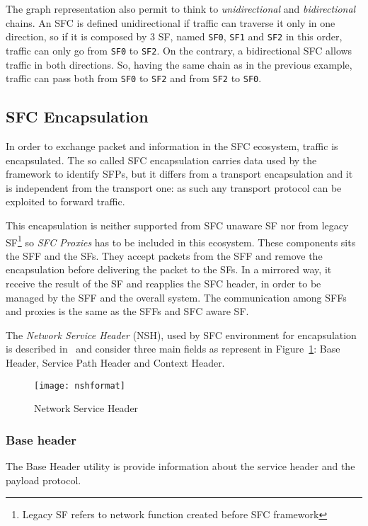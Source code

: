 The graph representation also permit to think to \emph{unidirectional} and
\emph{bidirectional} chains. An SFC is defined unidirectional if traffic can
traverse it only in one direction, so if it is composed by 3 SF, named
\texttt{SF0}, \texttt{SF1} and \texttt{SF2} in this order, traffic can only go
from \texttt{SF0} to \texttt{SF2}. On the contrary, a bidirectional SFC allows
traffic in both directions. So, having the same chain as in the previous
example, traffic can pass both from \texttt{SF0} to \texttt{SF2} and from
\texttt{SF2} to \texttt{SF0}.

\subsection{SFC Encapsulation}
In order to exchange packet and information in the SFC ecosystem, traffic is
encapsulated. The so called SFC encapsulation carries data used by the
framework to identify SFPs, but it differs from a transport encapsulation and it
is independent from the transport one: as such any transport protocol can be
exploited to forward traffic.

This encapsulation is neither supported from SFC unaware SF nor from legacy 
SF\footnote{Legacy SF refers to network function created before SFC framework}
so \emph{SFC Proxies} has to be included in this ecosystem. These components
sits the SFF and the SFs. They accept packets from the SFF and remove the
encapsulation before delivering the packet to the SFs. In a mirrored way, it
receive the result of the SF and reapplies the SFC header, in order to be
managed by the SFF and the overall system. The communication among SFFs and
proxies is the same as the SFFs and SFC aware SF.

The \emph{Network Service Header} (NSH), used by SFC environment for
encapsulation is described in~\cite{rfc8300} and consider three main fields as
represent in Figure~\ref{chap:background:img:nshformat}: Base Header, Service
Path Header and Context Header.
\begin{figure}[H]
  \centering
  \texttt{[image: nshformat]}
  \caption{Network Service Header~\cite{rfc8300}}
  \label{chap:background:img:nshformat}
\end{figure}

\subsubsection{Base header}
The Base Header utility is provide information about the service header and the
payload protocol.

